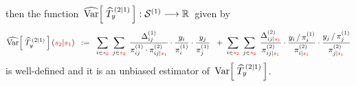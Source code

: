 \begin{theorem}
\begin{enumerate}
	then the function
	\,$\widehat{\textnormal{Var}}\!\left[\;\widehat{T}^{\,(2 \vert 1)}_{y}\,\right] : \mathcal{S}^{(1)} \longrightarrow \mathbb{R}$\,
	given by
	\begin{equation*}
	\widehat{\textnormal{Var}}\!\left[\;\widehat{T}^{\,(2 \vert 1)}_{y}\,\right]({\color{red}s_{2}} \vert {\color{red}s_{1}})
	\;\; := \;\;
		\underset{i \in {\color{red}s_{2}}}{\sum}\;\,
		\underset{j \in {\color{red}s_{2}}}{\sum}\;\,
			\dfrac{ \Delta^{(1)}_{ij} }{ \pi^{(1)}_{ij} \cdot \pi^{(2)}_{ij \vert {\color{red}s_{1}}} }
			\cdot
			\dfrac{y_{i}}{\pi^{(1)}_{i}}
			\cdot
			\dfrac{y_{j}}{\pi^{(1)}_{j}}
		\;\; + \;
		\underset{i \in {\color{red}s_{2}}}{\sum}\;\,
		\underset{j \in {\color{red}s_{2}}}{\sum}\;\,
			\dfrac{ \Delta^{(2)}_{ij \vert {\color{red}s_{1}}} }{ \pi^{(2)}_{ij \vert {\color{red}s_{1}}} }
			\cdot
			\dfrac{ y_{i} \,/\, \pi^{(1)}_{i} }{ \pi^{(2)}_{i \vert {\color{red}s_{1}}} }
			\cdot
			\dfrac{ y_{j} \,/\, \pi^{(1)}_{j} }{ \pi^{(2)}_{j \vert {\color{red}s_{1}}} }
	\end{equation*}
	is well-defined and it is an unbiased estimator of \,$\textnormal{Var}\!\left[\;\widehat{T}^{\,(2 \vert 1)}_{y}\,\right]$.
\end{enumerate}
\end{theorem}
\proof
